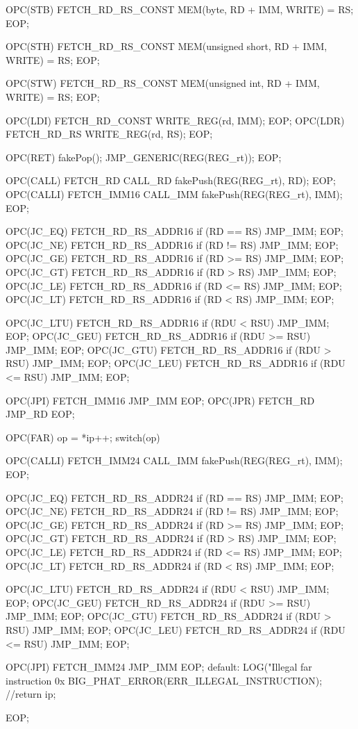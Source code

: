 \documentclass {article}
\begin{document}
\begin{verbatimtab}
OPC(STB)
{
	FETCH_RD_RS_CONST
	MEM(byte, RD + IMM, WRITE) = RS;
}
EOP;

OPC(STH)
{
	FETCH_RD_RS_CONST
	MEM(unsigned short, RD + IMM, WRITE) = RS;
}
EOP;

OPC(STW)
{
	FETCH_RD_RS_CONST
	MEM(unsigned int, RD + IMM, WRITE) = RS;
}
EOP;

OPC(LDI)	FETCH_RD_CONST	WRITE_REG(rd, IMM);	EOP;
OPC(LDR)	FETCH_RD_RS	WRITE_REG(rd, RS);	EOP;

OPC(RET)
	fakePop();
JMP_GENERIC(REG(REG_rt));
EOP;

OPC(CALL)
	FETCH_RD
	CALL_RD
	fakePush(REG(REG_rt), RD);
EOP;
OPC(CALLI)
	FETCH_IMM16
	CALL_IMM
	fakePush(REG(REG_rt), IMM);
EOP;

OPC(JC_EQ) 	FETCH_RD_RS_ADDR16	if (RD == RS)	{ JMP_IMM; } 	EOP;
OPC(JC_NE)	FETCH_RD_RS_ADDR16	if (RD != RS)	{ JMP_IMM; }	EOP;
OPC(JC_GE)	FETCH_RD_RS_ADDR16	if (RD >= RS)	{ JMP_IMM; }	EOP;
OPC(JC_GT)	FETCH_RD_RS_ADDR16	if (RD >  RS)	{ JMP_IMM; }	EOP;
OPC(JC_LE)	FETCH_RD_RS_ADDR16	if (RD <= RS)	{ JMP_IMM; }	EOP;
OPC(JC_LT)	FETCH_RD_RS_ADDR16	if (RD <  RS)	{ JMP_IMM; }	EOP;

OPC(JC_LTU)	FETCH_RD_RS_ADDR16	if (RDU <  RSU)	{ JMP_IMM; }	EOP;
OPC(JC_GEU)	FETCH_RD_RS_ADDR16	if (RDU >= RSU)	{ JMP_IMM; }	EOP;
OPC(JC_GTU)	FETCH_RD_RS_ADDR16	if (RDU >  RSU)	{ JMP_IMM; }	EOP;
OPC(JC_LEU)	FETCH_RD_RS_ADDR16	if (RDU <= RSU)	{ JMP_IMM; }	EOP;

OPC(JPI)		FETCH_IMM16		JMP_IMM		EOP;
OPC(JPR)		FETCH_RD		JMP_RD		EOP;

OPC(FAR) op = *ip++; switch(op) {
	OPC(CALLI)
		FETCH_IMM24
		CALL_IMM
		fakePush(REG(REG_rt), IMM);
	EOP;

	OPC(JC_EQ) 	FETCH_RD_RS_ADDR24	if (RD == RS)	{ JMP_IMM; } 	EOP;
	OPC(JC_NE)	FETCH_RD_RS_ADDR24	if (RD != RS)	{ JMP_IMM; }	EOP;
	OPC(JC_GE)	FETCH_RD_RS_ADDR24	if (RD >= RS)	{ JMP_IMM; }	EOP;
	OPC(JC_GT)	FETCH_RD_RS_ADDR24	if (RD >  RS)	{ JMP_IMM; }	EOP;
	OPC(JC_LE)	FETCH_RD_RS_ADDR24	if (RD <= RS)	{ JMP_IMM; }	EOP;
	OPC(JC_LT)	FETCH_RD_RS_ADDR24	if (RD <  RS)	{ JMP_IMM; }	EOP;

	OPC(JC_LTU)	FETCH_RD_RS_ADDR24	if (RDU <  RSU)	{ JMP_IMM; }	EOP;
	OPC(JC_GEU)	FETCH_RD_RS_ADDR24	if (RDU >= RSU)	{ JMP_IMM; }	EOP;
	OPC(JC_GTU)	FETCH_RD_RS_ADDR24	if (RDU >  RSU)	{ JMP_IMM; }	EOP;
	OPC(JC_LEU)	FETCH_RD_RS_ADDR24	if (RDU <= RSU)	{ JMP_IMM; }	EOP;

	OPC(JPI)		FETCH_IMM24		JMP_IMM		EOP;
default:
	LOG("Illegal far instruction 0x%
	BIG_PHAT_ERROR(ERR_ILLEGAL_INSTRUCTION);
	//return ip;
} EOP;


\end{verbatimtab}
\end{document}
